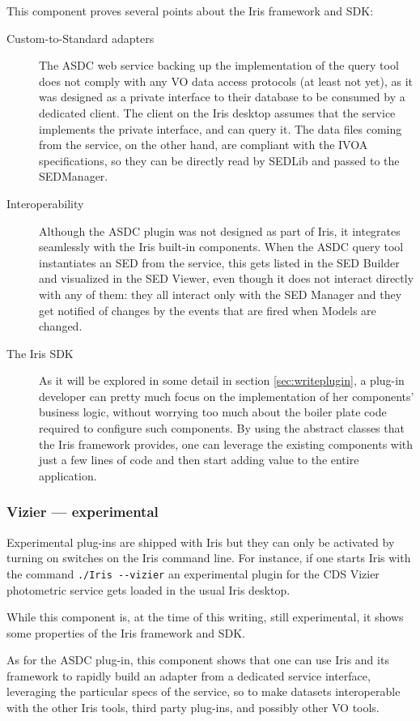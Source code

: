 \documentclass[final,5p]{elsarticle}
\begin{document}
This component proves several points about the Iris framework and SDK:
\begin{description}
\item[Custom-to-Standard adapters] The ASDC web service backing up the implementation of the query tool does not comply with any VO data access protocols (at least not yet), as it was designed as a private interface to their database to be consumed by a dedicated client. The client on the Iris desktop assumes that the service implements the private interface, and can query it. The data files coming from the service, on the other hand, are compliant with the IVOA specifications, so they can be directly read by SEDLib and passed to the SEDManager.
\item[Interoperability] Although the ASDC plugin was not designed as part of Iris, it integrates seamlessly with the Iris built-in components. When the ASDC query tool instantiates an SED from the service, this gets listed in the SED Builder and visualized in the SED Viewer, even though it does not interact directly with any of them: they all interact only with the SED Manager and they get notified of changes by the events that are fired when Models are changed.
\item[The Iris SDK] As it will be explored in some detail in section \ref{sec:writeplugin}, a plug-in developer can pretty much focus on the implementation of her components' business logic, without worrying too much about the boiler plate code required to configure such components. By using the abstract classes that the Iris framework
provides, one can leverage the existing components with just a few lines of code and then start adding value to the entire application.
\end{description}

\subsubsection{Vizier --- experimental}
\label{sec:asdc}
Experimental plug-ins are shipped with Iris but they can only be activated by turning on switches on the Iris command line. For instance, if one starts Iris with the command \verb|./Iris --vizier| an experimental plugin for the CDS Vizier photometric service gets loaded in the usual Iris desktop.

While this component is, at the time of this writing, still experimental, it shows some properties of the Iris framework and SDK.

As for the ASDC plug-in, this component shows that one can use Iris and its framework to rapidly build an adapter from a dedicated service interface, leveraging the particular specs of the service, so to make datasets interoperable with the other Iris tools, third party plug-ins, and possibly other VO tools.
\end{document}
